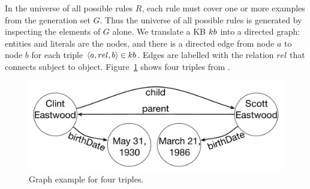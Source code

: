 In the universe of all possible rules $R$, 
each rule must cover one or more examples from the generation set $G$. 
Thus the universe of all possible rules is generated by inspecting the elements of $G$ alone. 
We translate a KB ${\sc kb}$ into a directed graph: entities and literals are the nodes, and there is a directed edge from node $a$ to node $b$ for each triple $\langle a,rel,b\rangle \in {\sc kb}$. 
Edges are labelled with the relation $rel$ that connects subject to object. Figure~\ref{fig:krd_graph_example} shows four triples from \dbpedia.

\begin{figure}[t]
	\centering
	\includegraphics[width=0.8\columnwidth]{include/figure/graph_example.pdf}
	\vspace{-2.5ex}
	\caption{Graph example for four triples.}
	\label{fig:krd_graph_example}
	\vspace{-3ex}
\end{figure}

